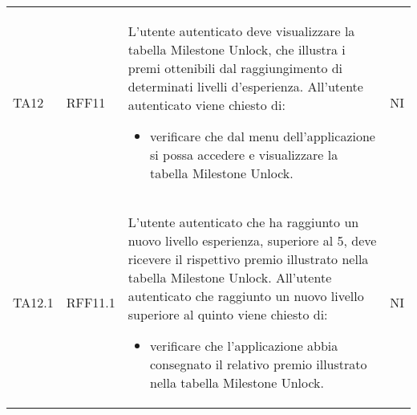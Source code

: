\begin{longtable}{ >{\centering}p{} >{\centering}p{} >{\centering}p{}
			>{\centering}p{}}
		 TA12	& RFF11 &	L'utente autenticato deve visualizzare la tabella Milestone Unlock\glo, che illustra i premi ottenibili dal raggiungimento di determinati livelli d'esperienza. All'utente autenticato viene chiesto di:
		 \begin{itemize}
		 	\item verificare che dal menu dell'applicazione si possa accedere e visualizzare la tabella Milestone Unlock.
		 \end{itemize}	&	NI	\tabularnewline		 
		 TA12.1	& RFF11.1 &	L'utente autenticato che ha raggiunto un nuovo livello esperienza, superiore al 5, deve ricevere il rispettivo premio illustrato nella tabella Milestone Unlock\glo. All'utente autenticato che raggiunto un nuovo livello superiore al quinto viene chiesto di:
		 \begin{itemize}
		 	\item verificare che l'applicazione abbia consegnato il relativo premio illustrato nella tabella Milestone Unlock.
		 \end{itemize}	&	NI	\tabularnewline
		 

\end{longtable}
